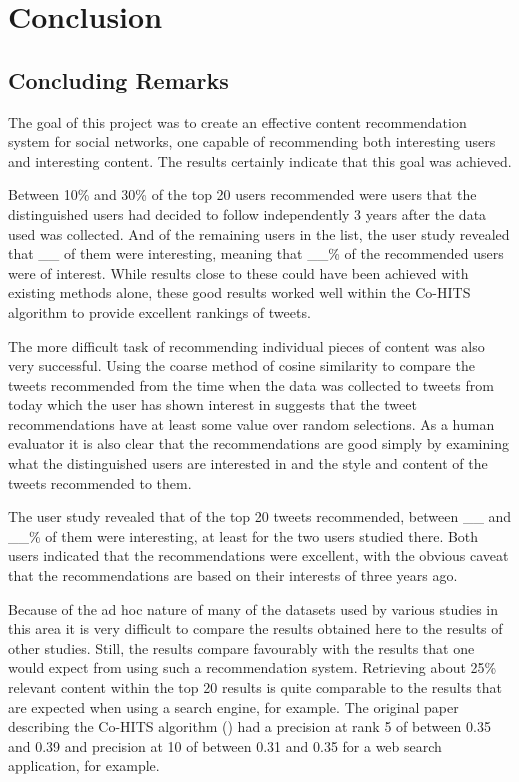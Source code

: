 \chapter{Conclusion}


\section{Concluding Remarks}

The goal of this project was to create an effective content recommendation system for social networks, one capable of recommending both interesting users and interesting content. The results certainly indicate that this goal was achieved.

Between 10\% and 30\% of the top 20 users recommended were users that the distinguished users had decided to follow independently 3 years after the data used was collected. And of the remaining users in the list, the user study revealed that \_\_ of them were interesting, meaning that \_\_\% of the recommended users were of interest. While results close to these could have been achieved with existing methods alone, these good results worked well within the Co-HITS algorithm to provide excellent rankings of tweets.

The more difficult task of recommending individual pieces of content was also very successful. Using the coarse method of cosine similarity to compare the tweets recommended from the time when the data was collected to tweets from today which the user has shown interest in suggests that the tweet recommendations have at least some value over random selections. As a human evaluator it is also clear that the recommendations are good simply by examining what the distinguished users are interested in and the style and content of the tweets recommended to them.

The user study revealed that of the top 20 tweets recommended, between \_\_ and \_\_\% of them were interesting, at least for the two users studied there. Both users indicated that the recommendations were excellent, with the obvious caveat that the recommendations are based on their interests of three years ago.

Because of the ad hoc nature of many of the datasets used by various studies in this area it is very difficult to compare the results obtained here to the results of other studies. Still, the results compare favourably with the results that one would expect from using such a recommendation system. Retrieving about 25\% relevant content within the top 20 results is quite comparable to the results that are expected when using a search engine, for example. The original paper describing the Co-HITS algorithm (\cite{Deng2009}) had a precision at rank 5 of between 0.35 and 0.39 and precision at 10 of between 0.31 and 0.35 for a web search application, for example.


